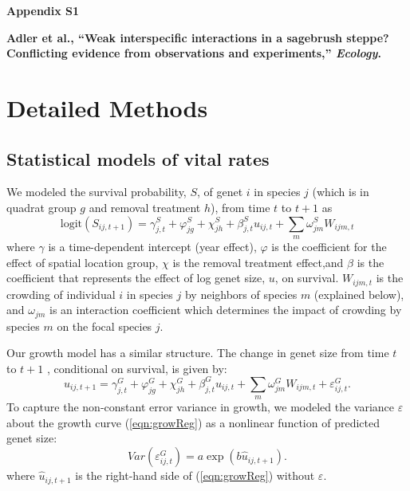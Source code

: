 \documentclass[11pt]{article}
\begin{document}
\setcounter{page}{1}
\setcounter{equation}{0}
\setcounter{figure}{0}
\setcounter{section}{0}
\setcounter{table}{0}

\centerline{\Large \textbf{Appendix S1}}

\vspace{0.2in} 

\noindent \textbf{Adler et al., ``Weak interspecific interactions in a sagebrush steppe? Conflicting evidence from observations and experiments,'' \textit{Ecology}. }

\vspace{0.2in} 

\renewcommand{\theequation}{S\arabic{equation}}
\renewcommand{\thetable}{S\arabic{table}}
\renewcommand{\thefigure}{S\arabic{figure}}
\renewcommand{\thesection}{\arabic{section}}

\linespread{1.75}


\section{Detailed Methods} 
\label{AppendixS1}

\subsection{Statistical models of vital rates}

We modeled the survival probability, $S$, of genet $i$ in species $j$ (which is in quadrat group $g$ and removal treatment $h$), 
from time $t$ to $t+1$  as
\begin{equation}
\mbox{logit}(S_{ij,t+1}) = \gamma_{j,t}^S + \varphi_{jg}^S+  \chi_{jh}^S  + \beta_{j,t}^S u_{ij,t} +  
\sum \limits_{m} \omega_{jm}^S {W}_{ijm,t}
\label{eqn:survReg}
\end{equation}
where $\gamma$ is a time-dependent intercept (year effect), $\varphi$ is the coefficient for the 
effect of spatial location group, $\chi$ is the removal treatment effect,and  $\beta$ is the coefficient that 
represents the effect of log genet size, $u$, on survival. 
$W_{ijm,t}$ is the crowding of individual $i$ in species $j$ by neighbors of species $m$ (explained below), and 
$\omega_{jm}$ is an interaction coefficient which determines the impact of crowding by species $m$ on the focal species $j$. 

Our growth model has a similar structure. The change in genet size from time $t$ to $t+1$ , conditional on survival, is given by:
\begin{equation}
u_{ij,t+1} = \gamma_{j,t}^G + \varphi_{jg}^G+  \chi_{jh}^G  + \beta_{j,t}^G u_{ij,t} + 
\sum \limits_{m} \omega_{jm}^G {W}_{ijm,t} + \varepsilon_{ij,t}^G .
\label{eqn:growReg}
\end{equation}
To capture the non-constant error variance in growth, we modeled the variance $\varepsilon$ about the growth 
curve (\ref{eqn:growReg}) as a nonlinear function of predicted genet size:
\begin{equation}
Var(\varepsilon_{ij,t}^G) = a \exp(b\hat{u}_{ij,t+1}).
\label{eqn:growVar}
\end{equation}
where $\hat{u}_{ij,t+1}$ is the right-hand side of (\ref{eqn:growReg}) without $\varepsilon$. 
\end{document}
